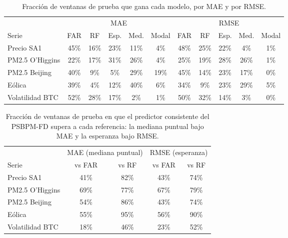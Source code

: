 \begin{table}[H]
\centering\small
\setlength{\tabcolsep}{3.5pt}
\caption{Fracción de ventanas de prueba que gana cada modelo, por MAE y por RMSE.}
\label{tab:aneD_bloqueA_ventanas}
\begin{tabular}{l ccccc ccccc}
\hline
 & \multicolumn{5}{c}{MAE} & \multicolumn{5}{c}{RMSE} \\
Serie & FAR & RF & Esp. & Med. & Modal & FAR & RF & Esp. & Med. & Modal \\
\hline
Precio SA1 & 45\% & 16\% & 23\% & 11\% & 4\% & 48\% & 25\% & 22\% & 4\% & 1\% \\
PM2.5 O'Higgins & 22\% & 17\% & 31\% & 26\% & 4\% & 25\% & 19\% & 28\% & 26\% & 1\% \\
PM2.5 Beijing & 40\% & 9\% & 5\% & 29\% & 19\% & 45\% & 14\% & 23\% & 17\% & 0\% \\
Eólica & 39\% & 4\% & 12\% & 40\% & 6\% & 34\% & 9\% & 23\% & 29\% & 5\% \\
Volatilidad BTC & 52\% & 28\% & 17\% & 2\% & 1\% & 50\% & 32\% & 14\% & 3\% & 0\% \\
\hline
\end{tabular}
\end{table}

\begin{table}[H]
\centering\small
\setlength{\tabcolsep}{3.5pt}
\caption{Fracción de ventanas de prueba en que el predictor consistente del PSBPM-FD supera a cada referencia: la mediana puntual bajo MAE y la esperanza bajo RMSE.}
\label{tab:aneD_bloqueA_gana}
\begin{tabular}{l cc cc}
\hline
 & \multicolumn{2}{c}{MAE (mediana puntual)} & \multicolumn{2}{c}{RMSE (esperanza)} \\
Serie & vs FAR & vs RF & vs FAR & vs RF \\
\hline
Precio SA1 & 41\% & 82\% & 43\% & 74\% \\
PM2.5 O'Higgins & 69\% & 77\% & 67\% & 79\% \\
PM2.5 Beijing & 54\% & 86\% & 43\% & 74\% \\
Eólica & 55\% & 95\% & 56\% & 90\% \\
Volatilidad BTC & 18\% & 46\% & 23\% & 52\% \\
\hline
\end{tabular}
\end{table}


